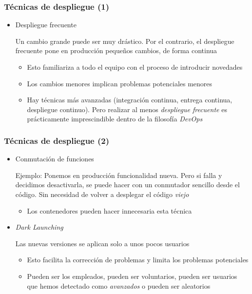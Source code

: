 \documentclass[ucs]{beamer}
\begin{document}
\begin{frame}[fragile]
\frametitle{Técnicas de despliegue (1)}
\begin{itemize}
\item
Despliegue frecuente

Un cambio grande puede ser muy drástico. Por el contrario, el 
despliegue frecuente pone
en producción pequeños cambios, de forma continua

\begin{itemize}
\item
Esto familiariza a todo el equipo con el proceso de introducir novedades

\item
Los cambios menores implican problemas potenciales menores

\item
Hay técnicas más avanzadas (integración continua, entrega continua, despliegue continuo).
Pero realizar al menos 
\emph{despliegue frecuente}
es prácticamente imprescindible dentro de la filosofía
\emph{DevOps}
\end{itemize}

\end{itemize}
\end{frame}
\begin{frame}[fragile]
\frametitle{Técnicas de despliegue (2)}
\begin{itemize}
\item
Conmutación de funciones

Ejemplo:
Ponemos en producción funcionalidad nueva. Pero si falla
y decidimos desactivarla, se puede hacer con un conmutador
sencillo desde el código. Sin necesidad de volver a desplegar
el código \emph{viejo}


\begin{itemize}
\item
Los contenedores pueden hacer innecesaria esta técnica
\end{itemize}

\item
\emph{Dark Launching}

Las nuevas versiones se aplican solo a unos pocos usuarios

\begin{itemize}
\item
Esto facilita la corrección de problemas y limita los problemas potenciales
\item
Pueden ser los empleados, pueden ser voluntarios, pueden ser usuarios
que hemos detectado como \emph{avanzados} o pueden ser aleatorios
\end{itemize}


\end{itemize}
\end{frame}
\end{document}
